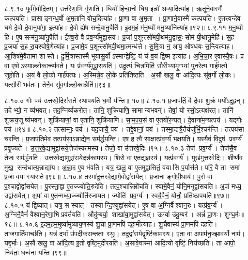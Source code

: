 ८.९.१०
पूर्व॑मे॒वोदि॒तम्। उत्त॑रेणा॒भि गृ॑णाति। धियो॑ हिन्वा॒नो धिय॒ इन्नो॑ अव्या॒दित्या॑ह। ऋ॒तूने॒वास्मै॑ कल्पयति। प्रासाङ्गन्ध॒र्वो अ॒मृता॑नि वोच॒दित्या॑ह। प्रा॒णा वा अ॒मृता। प्रा॒णाने॒वास्मै॑ कल्पयति। ए॒तत्त्वन्दे॑व घर्म दे॒वो दे॒वानुपा॑गा॒ इत्या॑ह। दे॒वो ह्ये॑ष सन्दे॒वानु॒पैति॑। इ॒दम॒हं म॑नु॒ष्यो॑ मनु॒ष्या॑नित्या॑ह॥९२॥
८.९.११
म॒नु॒ष्यो॑ हि। ए॒ष सन्म॑नु॒ष्या॑नु॒पैति॑। ई॒श्व॒रो वै प्र॑व॒र्ग्य॑मुद्वा॒सय\sn{}। प्र॒जां प॒शून्त्सो॑मपी॒थम॑नू॒द्वासः॒ सोम॑ पी॒थानु॒मेहि॑। स॒ह प्र॒जया॑ स॒ह रा॒यस्पोषे॒णेत्या॑ह। प्र॒जामे॒व प॒शून्त्सो॑मपी॒थमा॒त्मन्ध॑त्ते। सु॒मि॒त्रा न॒ आप॒ ओष॑धयः स॒न्त्वित्या॑ह। आ॒शिष॑मे॒वैतामा शास्ते। दु॒र्मि॒त्रास्तस्मै॑ भूयासु॒र्योऽस्मान्द्वेष्टि॒ यं च॑ व॒यं द्वि॒ष्म इत्या॑ह। अ॒भि॒चा॒र ए॒वास्यै॒षः। प्र वा ए॒षोऽस्माल्लो॒काच्च्य॑वते। यः प्र॑व॒र्ग्य॑मुद्वा॒सयति॑। उदु॒त्यं चि॒त्रमिति॑ सौ॒रीभ्या॑मृ॒ग्भ्यां पुन॒रेत्य॒ गार्\mbox{}ह॑पत्ये जुहोति। अ॒यं वै लो॒को गार्\mbox{}ह॑पत्यः। अ॒स्मिन्ने॒व लो॒के प्रति॑तिष्ठति। अ॒सौ खलु॒ वा आ॑दि॒त्यः सु॑व॒र्गो लो॒कः। यत्सौ॒री भव॑तः। तेनै॒व सु॑व॒र्गाल्लो॒कान्नैति॑॥९३॥
\anuvakamend

८.१०.०
गोः पय॑ उत्तरवे॒दिरा॑सते स्थापयति घ॒र्मो य॑न्ति॥ १०॥
८.१०.१
प्र॒जाप॑तिं॒ वै दे॒वाः  शु॒क्रं पयो॑ऽदुह्रन्। तदेभ्यो॒ न व्य॑भवत्। तद॒ग्निर्व्य॑करोत्। तानि॒ शुक्रि॑याणि॒ सामान्यभवन्। तेषां॒ यो रसो॒ऽत्यक्ष॑रत्। तानि॑ शुक्रय॒जूष्य॑भवन्। शुक्रि॑याणां॒ वा ए॒तानि॒ शुक्रि॑याणि। सा॒म॒प॒य॒सं वा ए॒तयो॑र॒न्यत्। दे॒वाना॑म॒न्यत्पय॑। यद्गोः पय॑॥९४॥
८.१०.२
तत्साम्नः॒ पय॑। यद॒जायै॒ पय॑। तद्दे॒वानां॒ पय॑। तस्मा॒द्यत्रै॒तैर्यजु॑र्भि॒श्चर॑न्ति। तत्पय॑सा चरन्ति। प्र॒जाप॑तिमे॒व तत्पय॑सा॒ऽन्नाद्ये॑न॒ सम॑र्द्धयन्ति। ए॒ष ह त्वै सा॒क्षात्प्र॑व॒र्ग्यं॑ भक्षयति। यस्यै॒वं  वि॒दुष॑ प्रव॒र्ग्य॑ प्रवृ॒ज्यते। उ॒त्त॒र॒वे॒द्यामुद्वा॑सये॒त्तेज॑स्कामस्य। तेजो॒ वा उ॑त्तरवे॒दिः॥९५॥
८.१०.३
तेज॑ प्रव॒र्ग्य॑। तेज॑सै॒व तेजः॒ सम॑र्द्धयति। उ॒त्त॒र॒वे॒द्यामुद्वा॑सये॒दन्न॑कामस्य। शिरो॒ वा ए॒तद्य॒ज्ञस्य॑। यत्प्र॑व॒र्ग्य॑। मुख॑मुत्तरवे॒दिः। शी॒र्ष्णैव मुख॒ सन्द॑धात्य॒न्नाद्या॑य। अ॒न्ना॒द ए॒व भ॑वति। यत्र॒ खलु॒ वा ए॒तमुद्वा॑सितं॒ वयासि प॒र्यास॑ते। परि॒ वै ता समां प्र॒जा वयास्यासते॥९६॥
८.१०.४
तस्मा॑दुत्तरवे॒द्यामे॒वोद्वा॑सयेत्। प्र॒जानाङ्गोपी॒थाय॑। पु॒रो वा॑ प॒श्चाद्वोद्वा॑सयेत्। पु॒रस्ता॒द्वा ए॒तज्ज्योति॒रुदे॑ति। तत्प॒श्चान्निम्रो॑चति। स्वामे॒वैनं॒ योनि॒मनूद्वा॑सयति। अ॒पां मध्य॒ उद्वा॑सयेत्। अ॒पां वा ए॒तन्मध्या॒ज्ज्योति॑रजायत। ज्योति॑ प्रव॒र्ग्य॑। स्वयै॒वैनं॒ योनौ॒ प्रति॑ष्ठापयति॥९७॥
८.१०.५
यं द्वि॒ष्यात्। यत्र॒ स स्यात्। तस्यान्दि॒श्युद्वा॑सयेत्। ए॒ष वा अ॒ग्निर्वैश्वान॒रः। यत्प्र॑व॒र्ग्य॑। अ॒ग्निनै॒वैनं॑ वैश्वान॒रेणा॒भि प्रव॑र्तयति। औदु॑म्बर्या॒ शाखा॑या॒मुद्वा॑सयेत्। ऊर्ग्वा उ॑दु॒म्बर॑। अन्नं॑ प्रा॒णः। शुग्घ॒र्मः॥९८॥
८.१०.६
इ॒दम॒हम॒मुष्या॑मुष्याय॒णस्य॑ शु॒चा प्रा॒णमपि॑ दहा॒मीत्या॑ह। शु॒चैवास्य॑ प्रा॒णमपि॑ दहति। ता॒जगार्ति॒मार्च्छ॑ति। यत्र॑ द॒र्भा उ॑प॒दीक॑सन्तताः॒ स्युः। तदुद्वा॑सये॒द्वृष्टि॑कामस्य। ए॒ता वा अ॒पाम॑नू॒ज्झाव॑र्यो॒ नाम॑। यद्द॒र्भाः। अ॒सौ खलु॒ वा आ॑दि॒त्य इ॒तो वृष्टि॒मुदी॑रयति। अ॒सावे॒वास्मा॑ आदि॒त्यो वृष्टिं॒ निय॑च्छति। ता आपो॒ निय॑ता॒ धन्व॑ना यन्ति॥९९॥
\anuvakamend

